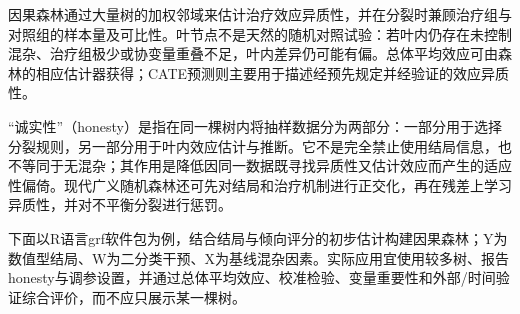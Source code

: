 \documentclass[
  chinese-hans,
  letterpaper,
  DIV=11,
  numbers=noendperiod]{scrreprt}
\begin{document}
因果森林通过大量树的加权邻域来估计治疗效应异质性，并在分裂时兼顾治疗组与对照组的样本量及可比性。叶节点不是天然的随机对照试验：若叶内仍存在未控制混杂、治疗组极少或协变量重叠不足，叶内差异仍可能有偏。总体平均效应可由森林的相应估计器获得；CATE预测则主要用于描述经预先规定并经验证的效应异质性。

``诚实性''（honesty）是指在同一棵树内将抽样数据分为两部分：一部分用于选择分裂规则，另一部分用于叶内效应估计与推断。它不是完全禁止使用结局信息，也不等同于无混杂；其作用是降低因同一数据既寻找异质性又估计效应而产生的适应性偏倚。现代广义随机森林还可先对结局和治疗机制进行正交化，再在残差上学习异质性，并对不平衡分裂进行惩罚。

下面以R语言grf软件包为例，结合结局与倾向评分的初步估计构建因果森林；Y为数值型结局、W为二分类干预、X为基线混杂因素。实际应用宜使用较多树、报告honesty与调参设置，并通过总体平均效应、校准检验、变量重要性和外部/时间验证综合评价，而不应只展示某一棵树。
\end{document}
